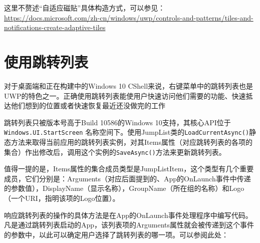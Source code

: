 这里不赘述“自适应磁贴”具体构造方式，可以参见：\href{https://docs.microsoft.com/zh-cn/windows/uwp/controls-and-patterns/tiles-and-notifications-create-adaptive-tiles}{https://docs.microsoft.com/zh-cn/windows/uwp/controls-and-patterns/tiles-and-notifications-create-adaptive-tiles}

\section{使用跳转列表}

对于桌面端和正在构建中的Windows 10 CShell来说，右键菜单中的跳转列表也是UWP的特色之一。正确使用跳转列表能使用户快速访问他们需要的功能、快速抵达他们想到的位置或者快速恢复最近还没做完的工作

跳转列表只被版本号高于Build 10586的Windows 10支持，其核心API位于\texttt{Windows.UI.StartScreen} 名称空间下。使用JumpList类的\texttt{LoadCurrentAsync()}静态方法来取得当前应用的跳转列表实例，对其Items属性（对应跳转列表的各项的集合）作出修改后，调用这个实例的\texttt{SaveAsync()}方法来更新跳转列表。

值得一提的是，Items属性的集合成员类型是JumpListItem，这个类型有几个重要成员，它们分别是：Arguments（对应后面提到的、App的OnLaunch事件中传递的参数值），DisplayName（显示名称），GroupName（所在组的名称）和Logo（一个URI，指明该项的Logo位置）。

响应跳转列表的操作的具体方法是在App的OnLaunch事件处理程序中编写代码。凡是通过跳转列表启动的App，该列表项的Arguments属性就会被传递到这个事件的参数中，以此可以确定用户选择了跳转列表的哪一项。可以参阅此处：